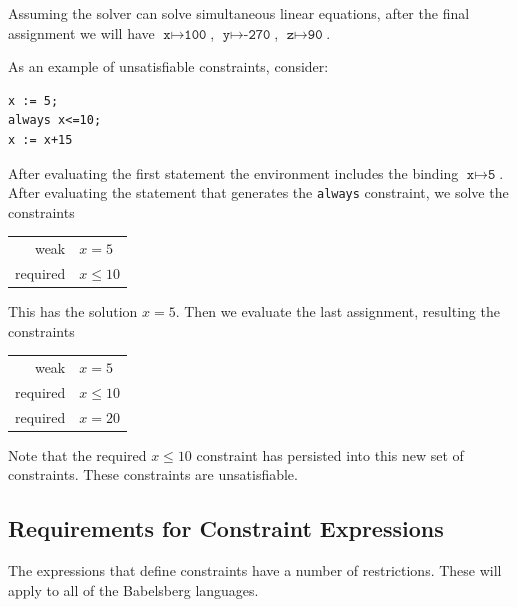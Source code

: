 \documentclass{article}
\begin{document}
Assuming the solver can solve simultaneous linear equations,
after the final assignment we will have 
$\texttt{x} \mapsto \texttt{100}$,
$\texttt{y} \mapsto \texttt{-270}$,
$\texttt{z} \mapsto \texttt{90}$.

As an example of unsatisfiable constraints, consider:
\begin{verbatim}
x := 5;
always x<=10;
x := x+15
\end{verbatim}

After evaluating the first statement the environment includes the
binding $\texttt{x} \mapsto \texttt{5}$.  After evaluating the
statement that generates the {\tt always} constraint, we solve the
constraints

\begin{tabular}{rl}
weak     & $x=5$ \\
required & $x \leq 10$
\end{tabular}

This has the solution $x=5$.  Then we evaluate the last
assignment, resulting the constraints

\begin{tabular}{rl}
weak     & $x=5$ \\
required & $x \leq 10$ \\
required & $x = 20$
\end{tabular}

Note that the required $x \leq 10$ constraint has persisted into this
new set of constraints.  These constraints are unsatisfiable.

\subsection{Requirements for Constraint Expressions}
\label{sec:constraint-expression-requirements} 

The expressions that define constraints have a number of restrictions.
These will apply to all of the Babelsberg languages.
\end{document}

